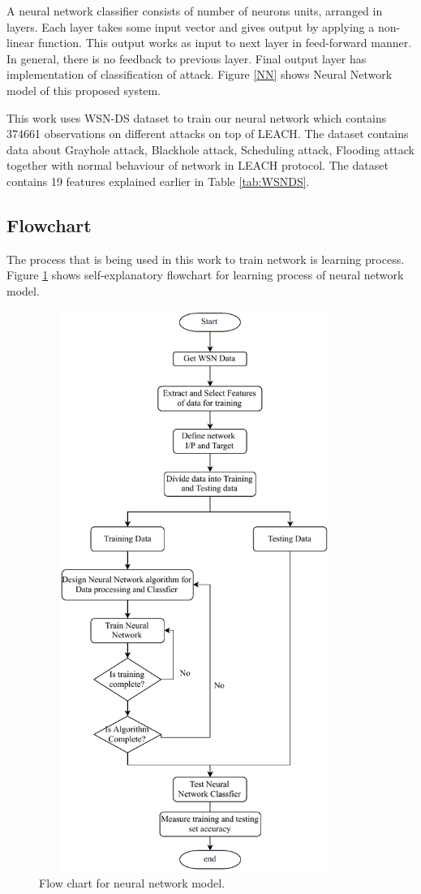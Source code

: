     A neural network classifier consists of number of neurons units, arranged in layers. Each layer takes some input vector and gives output by applying a non-linear function. This output works as input to next layer in feed-forward manner. In general, there is no feedback to previous layer. Final output layer has implementation of classification of attack. Figure \ref{NN} shows Neural Network model of this proposed system.
    \par This work uses WSN-DS dataset to train our neural network which contains 374661 observations on different attacks on top of LEACH. The dataset contains data about Grayhole attack, Blackhole attack, Scheduling attack, Flooding attack together with normal behaviour of network in LEACH protocol. The dataset contains 19 features explained earlier in Table \ref{tab:WSNDS}.
    \subsection{Flowchart}
    The process that is being used in this work to train network is learning process. Figure \ref{FlowChart} shows self-explanatory flowchart for learning process of neural network model.
        \begin{figure}[hbp]
        \center	
        \includegraphics[width=4in, height=7.2in] {Figures/PDF/FlowChart.pdf}
        \caption{Flow chart for neural network model.}
        \label{FlowChart}	
        \end{figure}

